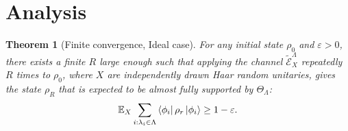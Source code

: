 \documentclass[10pt]{amsart}
\newtheorem{theorem}{Theorem}
\begin{document}
\section{Analysis}
\label{section:Analysis}
\begin{theorem}[Finite convergence, Ideal case]
\label{theorem_finite_convergence_ideal}
For any initial state $\rho_0$ and $\varepsilon > 0$, there exists a finite $R$ large enough such that applying the channel $\tilde{\mathcal{E}}^{\Lambda}_X$ repeatedly $R$ times to $\rho_0$, where $X$ are independently drawn Haar random unitaries, gives the state $\rho_R$ that is expected to be almost fully supported by $\Theta_\Lambda$:
\begin{equation}
\mathbb{E}_X \sum_{i: \lambda_i \in \Lambda} \bra{\phi_i} \rho_r \ket{\phi_i} \geq 1 - \varepsilon.
\end{equation}
\end{theorem}
\end{document}
